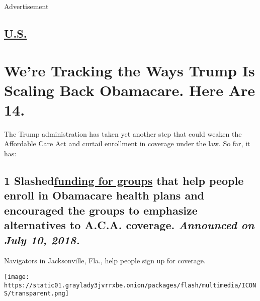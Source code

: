 Advertisement

\hypertarget{-us-}{%
\subsection{\texorpdfstring{
\href{https://www.nytimes3xbfgragh.onion/section/us}{U.S.}
}{ U.S. }}\label{-us-}}

\hypertarget{were-tracking-the-ways-trump-is-scaling-back-obamacare-here-are-14}{%
\section{We're Tracking the Ways Trump Is Scaling Back Obamacare. Here
Are
14.}\label{were-tracking-the-ways-trump-is-scaling-back-obamacare-here-are-14}}

The Trump administration has taken yet another step that could weaken
the Affordable Care Act and curtail enrollment in coverage under the
law. So far, it has:

\hypertarget{1-slashedfunding-for-groups-that-help-people-enroll-in-obamacare-health-plans-and-encouraged-the-groups-to-emphasize-alternatives-to-aca-coverage-announced-on-july-10-2018}{%
\subsection{\texorpdfstring{\textbf{1}
Slashed\href{https://www.nytimes3xbfgragh.onion/2018/07/10/us/politics/trump-affordable-care-act.html}{funding
for groups} that help people enroll in Obamacare health plans and
encouraged the groups to emphasize alternatives to A.C.A. coverage.
\emph{Announced on July 10,
2018.}}{1 Slashedfunding for groups that help people enroll in Obamacare health plans and encouraged the groups to emphasize alternatives to A.C.A. coverage. Announced on July 10, 2018.}}\label{1-slashedfunding-for-groups-that-help-people-enroll-in-obamacare-health-plans-and-encouraged-the-groups-to-emphasize-alternatives-to-aca-coverage-announced-on-july-10-2018}}

Navigators in Jacksonville, Fla., help people sign up for coverage.

\texttt{[image: https://static01.graylady3jvrrxbe.onion/packages/flash/multimedia/ICONS/transparent.png]}

